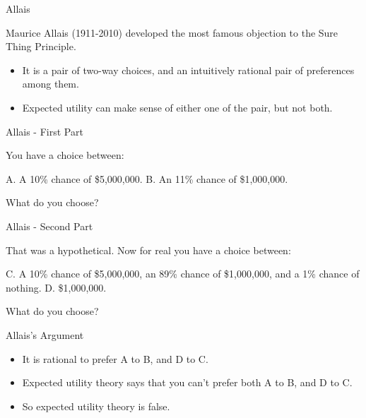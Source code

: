 \documentclass[
  ignorenonframetext,
]{beamer}
\providecommand{\tightlist}{%
  \setlength{\itemsep}{0pt}\setlength{\parskip}{0pt}}
\renewcommand{\,}{\text{, }}
\begin{document}
\begin{frame}{Allais}
\protect\hypertarget{allais}{}

Maurice Allais (1911-2010) developed the most famous objection to the
Sure Thing Principle.

\begin{itemize}
\tightlist
\item
  It is a pair of two-way choices, and an intuitively rational pair of
  preferences among them.
\item
  Expected utility can make sense of either one of the pair, but not
  both.
\end{itemize}

\end{frame}

\begin{frame}{Allais - First Part}
\protect\hypertarget{allais---first-part}{}

You have a choice between:

A. A 10\% chance of \$5,000,000. B. An 11\% chance of \$1,000,000.

What do you choose?

\end{frame}

\begin{frame}{Allais - Second Part}
\protect\hypertarget{allais---second-part}{}

That was a hypothetical. Now for real you have a choice between:

C. A 10\% chance of \$5,000,000, an 89\% chance of \$1,000,000, and a
1\% chance of nothing. D. \$1,000,000.

What do you choose?

\end{frame}

\begin{frame}{Allais's Argument}
\protect\hypertarget{allaiss-argument}{}

\begin{itemize}
\tightlist
\item
  It is rational to prefer A to B, and D to C. \pause
\item
  Expected utility theory says that you can't prefer both A to B, and D
  to C. \pause
\item
  So expected utility theory is false.
\end{itemize}

\end{frame}
\end{document}
